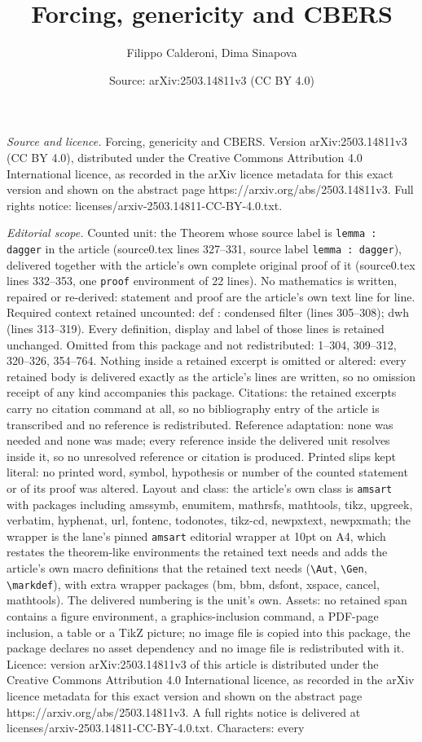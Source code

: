 \documentclass[10pt,a4paper]{amsart}
\title[Forcing, genericity and CBERS]{Forcing, genericity and CBERS}
\author{Filippo Calderoni, Dima Sinapova}
\date{Source: arXiv:2503.14811v3 (CC BY 4.0)}
\begin{document}
\maketitle

\noindent\emph{Source and licence.} Forcing, genericity and CBERS. Version arXiv:2503.14811v3 (CC BY 4.0), distributed under the Creative Commons Attribution 4.0 International licence, as recorded in the arXiv licence metadata for this exact version and shown on the abstract page https://arxiv.org/abs/2503.14811v3. Full rights notice: licenses/arxiv-2503.14811-CC-BY-4.0.txt.\par\smallskip

\noindent\textit{Editorial scope.} Counted unit: the Theorem whose source label is \texttt{lemma : dagger} in the article (source0.tex lines 327--331, source label \texttt{lemma : dagger}), delivered together with the article's own complete original proof of it (source0.tex lines 332--353, one \texttt{proof} environment of 22 lines). No mathematics is written, repaired or re-derived: statement and proof are the article's own text line for line. Required context retained uncounted: def : condensed filter (lines 305--308); dwh (lines 313--319). Every definition, display and label of those lines is retained unchanged. Omitted from this package and not redistributed: 1--304, 309--312, 320--326, 354--764. Nothing inside a retained excerpt is omitted or altered: every retained body is delivered exactly as the article's lines are written, so no omission receipt of any kind accompanies this package. Citations: the retained excerpts carry no citation command at all, so no bibliography entry of the article is transcribed and no reference is redistributed. Reference adaptation: none was needed and none was made; every reference inside the delivered unit resolves inside it, so no unresolved reference or citation is produced. Printed slips kept literal: no printed word, symbol, hypothesis or number of the counted statement or of its proof was altered. Layout and class: the article's own class is \texttt{amsart} with packages including amssymb, enumitem, mathrsfs, mathtools, tikz, upgreek, verbatim, hyphenat, url, fontenc, todonotes, tikz-cd, newpxtext, newpxmath; the wrapper is the lane's pinned \texttt{amsart} editorial wrapper at 10pt on A4, which restates the theorem-like environments the retained text needs and adds the article's own macro definitions that the retained text needs (\texttt{\textbackslash Aut}, \texttt{\textbackslash Gen}, \texttt{\textbackslash markdef}), with extra wrapper packages (bm, bbm, dsfont, xspace, cancel, mathtools). The delivered numbering is the unit's own. Assets: no retained span contains a figure environment, a graphics-inclusion command, a PDF-page inclusion, a table or a TikZ picture; no image file is copied into this package, the package declares no asset dependency and no image file is redistributed with it. Licence: version arXiv:2503.14811v3 of this article is distributed under the Creative Commons Attribution 4.0 International licence, as recorded in the arXiv licence metadata for this exact version and shown on the abstract page https://arxiv.org/abs/2503.14811v3. A full rights notice is delivered at licenses/arxiv-2503.14811-CC-BY-4.0.txt. Characters: every 
\end{document}
